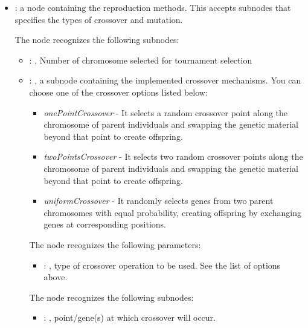 \begin{itemize}
\begin{itemize}
        \item {}:
          a node containing the reproduction methods. This accepts subnodes that specifies the types
          of crossover and mutation.

          The  node recognizes the following subnodes:
          \begin{itemize}
            \item {}: ,
              Number of chromosome selected for tournament selection

            \item {}: ,
              a subnode containing the implemented crossover mechanisms. You can choose one of the
              crossover options listed below:                   \begin{itemize}
              \item \textit{onePointCrossover} - It selects a random crossover point along the
              chromosome of parent individuals and swapping the genetic material beyond that point
              to create offspring.                     \item \textit{twoPointsCrossover} - It
              selects two random crossover points along the chromosome of parent individuals and
              swapping the genetic material beyond that point to create offspring.
              \item \textit{uniformCrossover} - It randomly selects genes from two parent
              chromosomes with equal probability, creating offspring by exchanging genes at
              corresponding positions.                   \end{itemize}
              The  node recognizes the following parameters:
                \begin{itemize}
                  \item {}: ,
                    type of crossover operation to be used. See the list of options above.
              \end{itemize}

              The  node recognizes the following subnodes:
              \begin{itemize}
                \item {}: ,
                  point/gene(s) at which crossover will occur.


\end{itemize}
\end{itemize}
\end{itemize}
\end{itemize}

